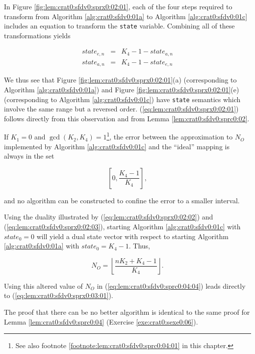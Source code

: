 \begin{vworklemmaproof}
In Figure \ref{fig:lem:crat0:sfdv0:sprx0:02:01}, each of the 
four steps required to transform from Algorithm \ref{alg:crat0:sfdv0:01a} to 
Algorithm \ref{alg:crat0:sfdv0:01c} includes an equation to transform the 
\texttt{state} variable.  Combining all of these
transformations yields

\begin{eqnarray}
\label{eq:lem:crat0:sfdv0:sprx0:02:02}
state_{e,n} & = & K_4 - 1 - state_{a,n} \\
\label{eq:lem:crat0:sfdv0:sprx0:02:03}
state_{a,n} & = & K_4 - 1 - state_{e,n}
\end{eqnarray} 

We thus see that Figure \ref{fig:lem:crat0:sfdv0:sprx0:02:01}(a)
(corresponding to Algorithm \ref{alg:crat0:sfdv0:01a}) and 
Figure \ref{fig:lem:crat0:sfdv0:sprx0:02:01}(e)
(corresponding to Algorithm \ref{alg:crat0:sfdv0:01c}) have 
\texttt{state} semantics which involve the same range
but a reversed order.  (\ref{eq:lem:crat0:sfdv0:sprx0:02:01})
follows directly from this observation and from
Lemma \ref{lem:crat0:sfdv0:sprc0:02}.
\end{vworklemmaproof}

\begin{vworklemmastatement}
\label{lem:crat0:sfdv0:sprx0:03}
If $K_1=0$ and $\gcd(K_2, K_4)=1$\footnote{See also
footnote \ref{footnote:lem:crat0:sfdv0:sprc0:04:01} in this chapter.}, the error between
the approximation to $N_O$ implemented by Algorithm \ref{alg:crat0:sfdv0:01c} 
and the ``ideal'' mapping is always
in the set

\begin{equation}
\label{eq:lem:crat0:sfdv0:sprx0:03:01}
\left[ 0, \frac{K_4 - 1}{K_4} \right] ,
\end{equation}

and no algorithm can be constructed to 
confine the error to a smaller interval.
\end{vworklemmastatement}
\begin{vworklemmaproof}
Using the duality illustrated by
(\ref{eq:lem:crat0:sfdv0:sprx0:02:02}) and 
(\ref{eq:lem:crat0:sfdv0:sprx0:02:03}),
starting Algorithm \ref{alg:crat0:sfdv0:01c} with 
$state_0=0$ will yield a dual state vector
with respect to starting Algorithm \ref{alg:crat0:sfdv0:01a} with
$state_0=K_4-1$.  Thus,

\begin{equation}
\label{eq:lem:crat0:sfdv0:sprx0:03:02}
N_O = \left\lfloor \frac{n K_2 + K_4 - 1}{K_4} \right\rfloor .
\end{equation}

Using this altered value of $N_O$ in (\ref{eq:lem:crat0:sfdv0:sprc0:04:04})
leads directly to (\ref{eq:lem:crat0:sfdv0:sprx0:03:01}).

The proof that there can be no better algorithm is identical
to the same proof for Lemma \ref{lem:crat0:sfdv0:sprc0:04} (Exercise \ref{exe:crat0:sexe0:06}).
\end{vworklemmaproof}

